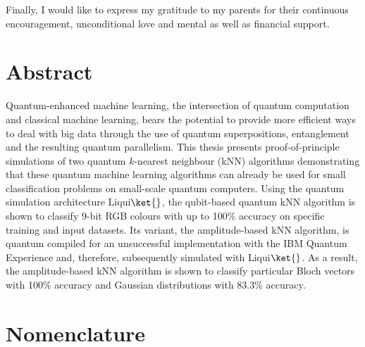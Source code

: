 Finally, I would like to express my gratitude to my parents for their continuous encouragement, unconditional love and mental as well as financial support.

 \cleardoublepage


 \setcounter{tocdepth}{2}
 \tableofcontents

 \cleardoublepage


\chapter*{Abstract}

Quantum-enhanced machine learning, the intersection of quantum computation and classical machine learning,
bears the potential to provide more efficient ways to deal with big data through the use of quantum
superpositions, entanglement and the resulting quantum parallelism. This thesis presents proof-of-principle simulations of two quantum $k$-nearest neighbour (kNN) algorithms demonstrating that these quantum machine learning algorithms can already be used for small classification problems on small-scale
quantum computers. Using the quantum simulation architecture Liqui$\ket{}$, the qubit-based quantum kNN algorithm is shown to classify 9-bit RGB colours with up to 100\% accuracy on specific training and input datasets. Its variant, the amplitude-based kNN algorithm, is quantum compiled for an unsuccessful implementation with the IBM Quantum Experience and, therefore, subsequently simulated with Liqui$\ket{}$. As a result, the amplitude-based kNN algorithm is shown to classify particular Bloch vectors with 100\% accuracy and Gaussian distributions with 83.3\% accuracy.

 \cleardoublepage


\chapter*{Nomenclature}\label{chap:symbole}

